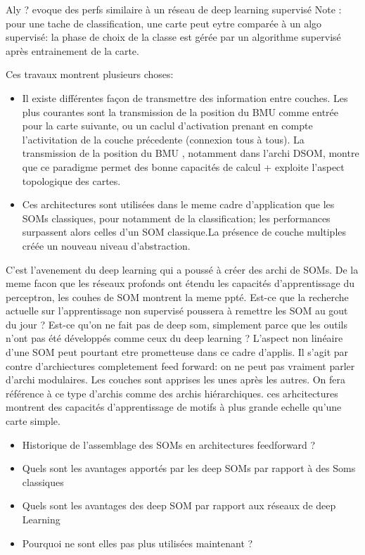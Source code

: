 \documentclass[../main]{subfiles}
\begin{document}
Aly ? evoque des perfs similaire à un réseau de deep learning supervisé
Note : pour une tache de classification, une carte peut eytre comparée à un algo supervisé: la phase de choix de la classe est gérée par un algorithme supervisé après entrainement de la carte.


Ces travaux montrent plusieurs choses:
\begin{itemize}
    \item Il existe différentes façon de transmettre des information entre couches. Les plus courantes sont la transmission de la position du BMU comme entrée pour la carte suivante, ou un caclul d'activation prenant en compte l'activitation de la couche précedente (connexion tous à tous).
    La transmission de la position du BMU , notamment dans l'archi DSOM, montre que ce paradigme permet des bonne capacités de calcul + exploite l'aspect topologique des cartes.
    \item Ces architectures sont utilisées dans le meme cadre d'application que les SOMs classiques, pour notamment de la classification; les performances surpassent alors celles d'un SOM classique.La présence de couche multiples créée un nouveau niveau d'abstraction.
\end{itemize}


C'est l'avenement du deep learning qui a poussé à créer des archi de SOMs. De la meme facon que les réseaux profonds ont étendu les capacités d'apprentissage du perceptron, les couhes de SOM montrent la meme ppté.
Est-ce que la recherche actuelle sur l'apprentissage non supervisé poussera à remettre les SOM au gout du jour ? Est-ce qu'on ne fait pas de deep som, simplement parce que les outils n'ont pas été développés comme ceux du deep learning ? L'aspect non linéaire d'une SOM peut pourtant etre prometteuse dans ce cadre d'applis.
Il s'agit par contre d'archiectures completement feed forward: on ne peut pas vraiment parler d'archi modulaires. Les couches sont apprises les unes après les autres.
On fera référence à ce type d'archis comme des archis hiérarchiques.
ces arhcitectures montrent des capacités d'apprentissage de motifs à plus grande echelle qu'une carte simple.

\begin{itemize}
    \item Historique de l'assemblage des SOMs en architectures feedforward ? 
    \item Quels sont les avantages apportés par les deep SOMs par rapport à des Soms classiques
    \item Quels sont les avantages des deep SOM par rapport aux réseaux de deep Learning 
    \item Pourquoi ne sont elles pas plus utilisées maintenant ?
\end{itemize}
\end{document}
